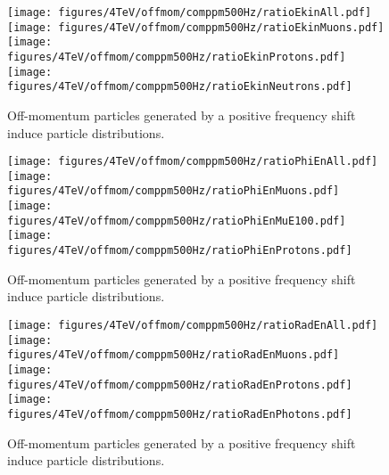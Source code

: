 \begin{figure}[!htb]
\begin{center}
  \texttt{[image: figures/4TeV/offmom/comppm500Hz/ratioEkinAll.pdf]}
  \texttt{[image: figures/4TeV/offmom/comppm500Hz/ratioEkinMuons.pdf]}
  \texttt{[image: figures/4TeV/offmom/comppm500Hz/ratioEkinProtons.pdf]}
  \texttt{[image: figures/4TeV/offmom/comppm500Hz/ratioEkinNeutrons.pdf]}
\end{center}
\vspace{-0.6cm}
 \caption{Off-momentum particles generated by a positive frequency shift induce particle distributions.
  \label{compPM_ekin}}
\end{figure}

\begin{figure}[!htb]
\begin{center}
  \texttt{[image: figures/4TeV/offmom/comppm500Hz/ratioPhiEnAll.pdf]}
  \texttt{[image: figures/4TeV/offmom/comppm500Hz/ratioPhiEnMuons.pdf]}
  \texttt{[image: figures/4TeV/offmom/comppm500Hz/ratioPhiEnMuE100.pdf]}
  \texttt{[image: figures/4TeV/offmom/comppm500Hz/ratioPhiEnProtons.pdf]}
\end{center}
\vspace{-0.6cm}
 \caption{Off-momentum particles generated by a positive frequency shift induce particle distributions.
  \label{compPM_phien}}
\end{figure}

\begin{figure}[!htb]
\begin{center}
  \texttt{[image: figures/4TeV/offmom/comppm500Hz/ratioRadEnAll.pdf]}
  \texttt{[image: figures/4TeV/offmom/comppm500Hz/ratioRadEnMuons.pdf]}
  \texttt{[image: figures/4TeV/offmom/comppm500Hz/ratioRadEnProtons.pdf]}
  \texttt{[image: figures/4TeV/offmom/comppm500Hz/ratioRadEnPhotons.pdf]}
\end{center}
\vspace{-0.6cm}
 \caption{Off-momentum particles generated by a positive frequency shift induce particle distributions.
  \label{compPM_raden}}
\end{figure}

